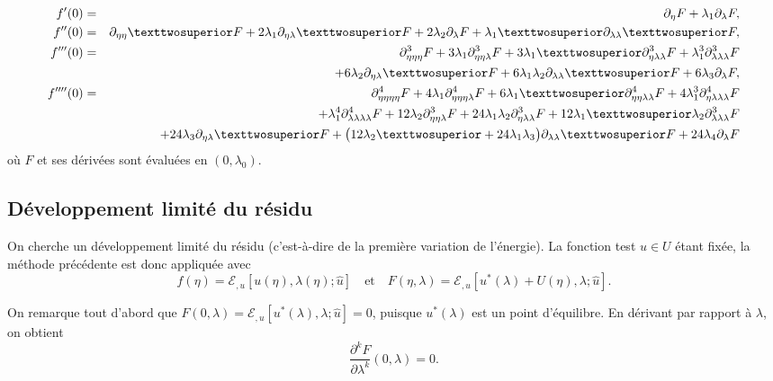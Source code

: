 \documentclass[12pt, final]{amsart}
\begin{document}
\begin{eqnarray}
  \label{eq20220107060454}
  f'(0)&=&\partial _\eta  F+\lambda _1\partial _\lambda  F,\\
  \label{eq20220107124311}
  f''(0)&=&\partial _{\eta \eta }²F+2\lambda _1\partial _{\eta \lambda }²F+2\lambda _2\partial _\lambda  F+\lambda _1²\partial _{\lambda \lambda }²F,\\
  \notag
  f'''(0)&=&\partial _{\eta \eta \eta }^3F+3\lambda _1\partial _{\eta \eta \lambda }^3F+3\lambda _1²\partial _{\eta \lambda \lambda }^3F+\lambda _1^3\partial _{\lambda \lambda \lambda }^3F\\
  \label{eq20220107060500}
       &&+6\lambda _2\partial _{\eta \lambda }²F+6\lambda _1\lambda _2\partial _{\lambda \lambda }²F+6\lambda _3\partial _\lambda F,\\
  \notag
  f''''(0)&=&\partial _{\eta \eta \eta \eta }^4F+4\lambda _1\partial _{\eta \eta \eta \lambda }^4F+6\lambda _1²\partial _{\eta \eta \lambda \lambda }^4F+4\lambda _1^3\partial _{\eta \lambda \lambda \lambda }^4F\\
  \notag
       &&+\lambda _1^4\partial _{\lambda \lambda \lambda \lambda }^4F+12\lambda _2\partial _{\eta \eta \lambda }^3F+24\lambda _1\lambda _2\partial _{\eta \lambda \lambda }^3F+12\lambda _1²\lambda _2\partial _{\lambda \lambda \lambda }^3F\\
       &&+24\lambda _3\partial _{\eta \lambda }²F+\bigl(12\lambda _2²+24\lambda _1\lambda _3\bigr)\partial _{\lambda \lambda }²F+24\lambda _4\partial _\lambda F
\end{eqnarray}
où \(F\) et ses dérivées sont évaluées en \((0, \lambda _0)\).

\subsection{Développement limité du résidu}
\label{sec20211112182000}

On cherche un développement limité du résidu (c'est-à-dire de la première
variation de l'énergie). La fonction test \(\hat{u}\in U\) étant fixée, la
méthode précédente est donc appliquée avec
\begin{equation}
  \label{eq20220107054629}
  f(\eta )=\mathcal E_{,u}[u(\eta ), \lambda (\eta );\hat{u}]
  \quad\text{et}\quad
  F(\eta , \lambda )=\mathcal E_{,u}[u^*(\lambda )+U(\eta ), \lambda ; \hat{u}].
\end{equation}

On remarque tout d'abord que \(F(0, \lambda )=\mathcal E_{,u}[u^*(\lambda ), \lambda ; \hat{u}]=0\), puisque
\(u^*(\lambda )\) est un point d'équilibre. En dérivant par rapport à \(\lambda \), on obtient
\begin{equation}
  \label{eq20211112164240}
  \frac{\partial ^kF}{\partial \lambda ^k}(0, \lambda )=0.
\end{equation}
\end{document}
